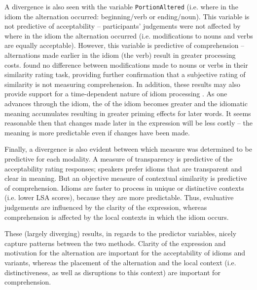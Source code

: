 \documentclass[output=paper,modfonts,nonflat]{langsci/langscibook}
\begin{document}
A divergence is also seen with the variable \texttt{PortionAltered} (i.e. where in the idiom the alternation occurred: beginning/verb or ending/noun). This variable is not predictive of acceptability -- participants' judgements were not affected by where in the idiom the alternation occurred (i.e. modifications to nouns and verbs are equally acceptable). However, this variable is predictive of comprehension -- alternations made earlier in the idiom (the verb) result in greater processing costs. \citet{GibbsEtAl1989} found no difference between modifications made to nouns or verbs in their similarity rating task, providing further confirmation that a subjective rating of similarity is not measuring comprehension. In addition, these results may also provide support for a time-dependent nature of idiom processing \citep{TitoneLibben2014}. As one advances through the idiom, the  of the idiom becomes greater and the idiomatic meaning accumulates resulting in greater priming effects for later words. It seems reasonable then that changes made later in the expression will be less costly -- the meaning is more predictable even if changes have been made.

Finally, a divergence is also evident between which  measure was determined to be predictive for each modality. A measure of transparency is predictive of the acceptability rating responses; speakers prefer idioms that are transparent and clear in meaning. But an objective measure of contextual similarity is predictive of comprehension. Idioms are faster to process in unique or distinctive contexts (i.e. lower LSA scores), because they are more predictable. Thus, evaluative judgements are influenced by the clarity of the expression, whereas comprehension is affected by the local contexts in which the idiom occurs.

These (largely diverging) results,  in regards to the predictor variables, nicely capture patterns between the two methods. Clarity of the expression and motivation for the alternation are important for the acceptability of idioms and variants, whereas the placement of the alternation and the local context (i.e. distinctiveness, as well as disruptions to this context) are important for comprehension.
\end{document}
